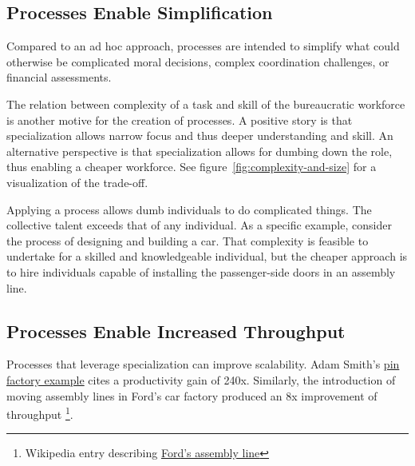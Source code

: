\subsection*{Processes Enable Simplification}
Compared to an ad hoc approach, processes are intended to simplify what could otherwise be complicated moral decisions, complex coordination challenges, or financial assessments. %


The relation between complexity of a task and skill of the bureaucratic workforce is another motive for the creation of processes.
A positive story is that specialization allows narrow focus and thus deeper understanding and skill. An alternative perspective is that specialization allows for dumbing down the role, thus enabling a cheaper workforce. See figure~\ref{fig:complexity-and-size} \iftoggle{haspagenumbers}{on page~\pageref{fig:complexity-and-size}}{}
for a visualization of the trade-off.

Applying a process allows dumb individuals to do complicated things. The collective talent exceeds that of any individual.  As a specific example, consider the process of designing and building a car. That complexity is feasible to undertake for a skilled and knowledgeable individual, but the cheaper approach is to hire individuals capable of installing the passenger-side doors in an assembly line.


\subsection*{Processes Enable Increased Throughput}

Processes that leverage specialization can improve scalability. Adam Smith's \href{https://en.wikipedia.org/wiki/Business_process#Adam_Smith}{pin factory example} cites a productivity gain of 240x.
Similarly, the introduction of moving assembly lines in Ford's car factory produced an 8x improvement of throughput \footnote{Wikipedia entry describing \href{https://en.wikipedia.org/wiki/Assembly_line\%2320th_century}{Ford's assembly line}
}. 


